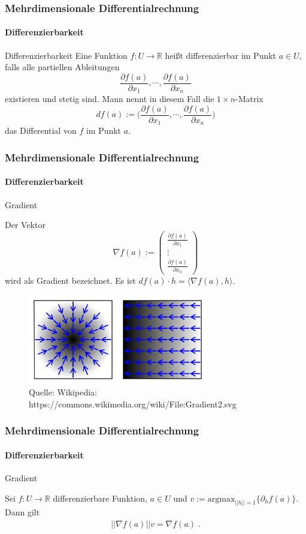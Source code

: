 \documentclass{beamer}
\begin{document}
\begin{frame}
    \frametitle{Mehrdimensionale Differentialrechnung}
\framesubtitle{Differenzierbarkeit}
    \begin{block}{Differenzierbarkeit}
Eine Funktion $f: U \to \mathbb{R}$ heißt  differenzierbar im Punkt $a \in U$, falls alle partiellen Ableitungen 
$$\frac{\partial f(a)}{\partial x_1}, \cdots, \frac{\partial f(a)}{\partial x_n}$$
 existieren und stetig sind.  Mann nennt  in diesem Fall die $1 \times n$-Matrix 
$$df(a) := \biggl( \frac{\partial f(a)}{\partial x_1}, \cdots, \frac{\partial f(a)}{\partial x_n} \biggr)$$
das Differential von $f$ im Punkt $a$. 
\end{block}


 \end{frame}
\begin{frame}
    \frametitle{Mehrdimensionale Differentialrechnung}
\framesubtitle{Differenzierbarkeit}
    \begin{block}{Gradient}

Der Vektor 
$$\nabla f (a) := \begin{pmatrix}  \frac{\partial f(a)}{\partial x_1} \\  \vdots \\ \frac{\partial f(a)}{\partial x_n}  \end{pmatrix}$$
wird als Gradient bezeichnet. Es ist $df(a) \cdot h = \langle \nabla f (a) , h \rangle$.
\end{block}
\begin{figure}[H]
      \centering
    \includegraphics[width=0.7\textwidth]{images/Gradient}
      \caption{Quelle: Wikipedia: https://commons.wikimedia.org/wiki/File:Gradient2.svg}
\end{figure}


 \end{frame}


\begin{frame}
    \frametitle{Mehrdimensionale Differentialrechnung}
\framesubtitle{Differenzierbarkeit}
    \begin{block}{Gradient}

Sei   $f: U \to \mathbb{R}$ differenzierbare Funktion,  $a \in U$ und $v := \text{argmax}_{ ||h|| = 1 } \{ \partial_h f(a) \}$.
Dann gilt 
\begin{align*}
|| \nabla f(a) || v =  \nabla f(a) \; .
\end{align*} 
\end{block}

 \end{frame}
\end{document}
